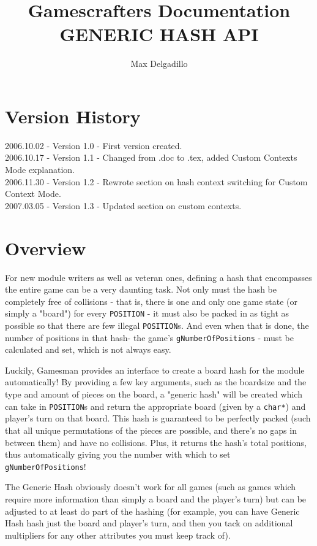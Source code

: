 \documentclass[11pt]{article}
\begin{document}
\title{Gamescrafters Documentation\\
GENERIC HASH API}
\author{Max Delgadillo}
\date{}
\maketitle

\section*{Version History}
2006.10.02 - Version 1.0 - First version created.\\
2006.10.17 - Version 1.1 - Changed from .doc to .tex, added Custom Contexts Mode explanation.\\
2006.11.30 - Version 1.2 - Rewrote section on hash context switching for Custom Context Mode.\\
2007.03.05 - Version 1.3 - Updated section on custom contexts.

\tableofcontents
\newpage

\section{Overview}
For new module writers as well as veteran ones, defining a hash that encompasses the entire game can be a very daunting task. Not only must the hash be completely free of collisions - that is, there is one and only one game state (or simply a "board") for every \texttt{POSITION} - it must also be packed in as tight as possible so that there are few illegal \texttt{POSITION}s. And even when that is done, the number of positions in that hash- the game's \texttt{gNumberOfPositions} - must be calculated and set, which is not always easy.

Luckily, Gamesman provides an interface to create a board hash for the module automatically! By providing a few key arguments, such as the boardsize and the type and amount of pieces on the board, a "generic hash" will be created which can take in \texttt{POSITION}s and return the appropriate board (given by a \texttt{char*}) and player's turn on that board. This hash is guaranteed to be perfectly packed (such that all unique permutations of the pieces are possible, and there's no gaps in between them) and have no collisions. Plus, it returns the hash's total positions, thus automatically giving you the number with which to set \texttt{gNumberOfPositions}!

The Generic Hash obviously doesn't work for all games (such as games which require more information than simply a board and the player's turn) but can be adjusted to at least do part of the hashing (for example, you can have Generic Hash hash just the board and player's turn, and then you tack on additional multipliers for any other attributes you must keep track of).
\end{document}
